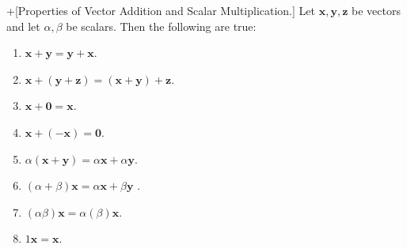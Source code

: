 \documentclass[10pt,]{book}
\theoremstyle{ptxplainnotitle}
\theoremstyle{ptxplaintitle}
\theoremstyle{ptxplainnotitle}
\theoremstyle{ptxplaintitle}
\theoremstyle{ptxplainnotitle}
\theoremstyle{ptxplaintitle}
\theoremstyle{ptxdefinitionnotitle}
\theoremstyle{ptxdefinitiontitle}
\theoremstyle{ptxdefinitionnotitle}
\theoremstyle{ptxdefinitiontitle}
\theoremstyle{ptxdefinitionnotitle}
\theoremstyle{ptxdefinitiontitle}
\theoremstyle{ptxdefinitionnotitle}
\theoremstyle{ptxdefinitiontitle}
\theoremstyle{ptxdefinitionnotitle}
\theoremstyle{ptxdefinitiontitle}
\numberwithin{equation}{section}
\newcommand{\vv}[1]{\mathbf{#1}}
\begin{document}
\begin{theorem}+[{Properties of Vector Addition and Scalar Multiplication.}]\label{theorem-properties-of-vector-addition-and-scalar-multiplication}
\hypertarget{p-755}{}%
Let \(\vv{x},\vv{y},\vv{z}\) be vectors and let \(\alpha,\beta\) be scalars. Then the following are true:%
\leavevmode%
\begin{multicols}{2}
\begin{enumerate}
\item\hypertarget{li-52}{}\hypertarget{p-756}{}%
\(\vv{x}+\vv{y} = \vv{y}+\vv{x}\).%
\item\hypertarget{li-53}{}\hypertarget{p-757}{}%
\(\vv{x}+(\vv{y}+\vv{z}) = (\vv{x}+\vv{y})+\vv{z}.\)%
\item\hypertarget{li-54}{}\hypertarget{p-758}{}%
\(\vv{x}+\vv{0} = \vv{x}.\)%
\item\hypertarget{li-55}{}\hypertarget{p-759}{}%
\(\vv{x}+(-\vv{x}) = \vv{0}.\)%
\item\hypertarget{li-56}{}\hypertarget{p-760}{}%
\(\alpha(\vv{x}+\vv{y}) = \alpha\vv{x}+\alpha\vv{y}.\)%
\item\hypertarget{li-57}{}\hypertarget{p-761}{}%
\((\alpha+\beta)\vv{x} = \alpha\vv{x}+\beta\vv{y}\)%
. \item\hypertarget{li-58}{}\hypertarget{p-762}{}%
\((\alpha\beta)\vv{x} = \alpha(\beta)\vv{x}.\)%
\item\hypertarget{li-59}{}\hypertarget{p-763}{}%
\(1\vv{x} = \vv{x}.\)%
\end{enumerate}
\end{multicols}
\end{theorem}
\typeout{************************************************}
\typeout{************************************************}
\end{document}

